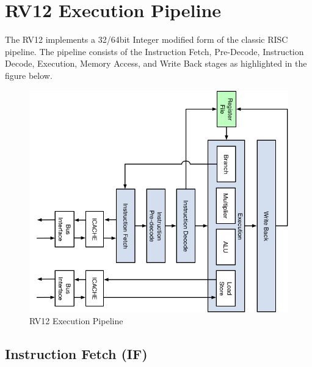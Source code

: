 \chapter{RV12 Execution Pipeline}

The RV12 implements a 32/64bit Integer modified form of the classic RISC pipeline.
The pipeline consists of the Instruction Fetch, Pre-Decode, Instruction Decode, Execution, Memory Access, and Write Back stages as highlighted in the figure below.


\begin{figure}[h]
  \includegraphics{assets/img/Pipeline-Overview}
  \caption{RV12 Execution Pipeline}
\end{figure}

\pagebreak

\section{Instruction Fetch (IF)}\label{instruction-fetch-if}

